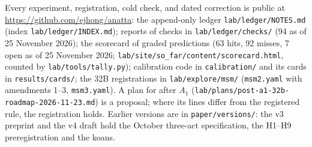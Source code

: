 \documentclass[11pt]{article}
\begin{document}
Every experiment, registration, cold check, and dated correction is public at \url{https://github.com/ejhong/anatta}: the append-only ledger \texttt{lab/ledger/NOTES.md} (index \texttt{lab/ledger/INDEX.md}); reports of checks in \texttt{lab/ledger/checks/} (94 as of 25 November 2026); the scorecard of graded predictions (63 hits, 92 misses, 7 open as of 25 November 2026; \texttt{lab/site/so\_far/content/scorecard.html}, counted by \texttt{lab/tools/tally.py}); calibration code in \texttt{calibration/} and its cards in \texttt{results/cards/}; the 32B registrations in \texttt{lab/explore/msm/} (\texttt{msm2.yaml} with amendments 1--3, \texttt{msm3.yaml}). A plan for after $A_1$ (\texttt{lab/plans/post-a1-32b-roadmap-2026-11-23.md}) is a proposal; where its lines differ from the registered rule, the registration holds. Earlier versions are in \texttt{paper/versions/}: the v3 preprint and the v4 draft hold the October three-act specification, the H1--H9 preregistration and the koans.
\end{document}
